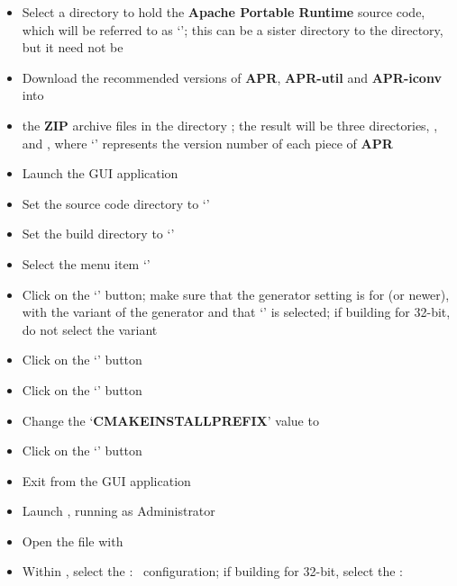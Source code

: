 \begin{itemize}
\item Select a directory to hold the \textbf{Apache Portable Runtime} source code, which
will be referred to as `'; this can be a sister directory to the
 directory, but it need not be
\item\exSp{}Download the recommended versions of \textbf{APR}, \textbf{APR-util} and
\textbf{APR-iconv} into 
\item\exSp{} the \textbf{ZIP} archive files in the directory
; the result will be three directories, ,\\
 and , where `'
represents the version number of each piece of \textbf{APR}
\item Launch the  GUI application
\item\exSp{}Set the source code directory to `'
\item\exSp{}Set the build directory to `'
\item\exSp{}Select the menu item `'
\item\exSp{}Click on the `' button; make sure that the generator
setting is for  (or newer), with the  variant of
the generator and that `' is selected; if building
for 32-bit, do not select the  variant
\item\exSp{}Click on the `' button
\item\exSp{}Click on the `' button
\item\exSp{}Change the `\textbf{CMAKE\fUS{}INSTALL\fUS{}PREFIX}' value to
\item\exSp{}Click on the `' button
\item\exSp{}Exit from the  GUI application
\item\exSp{}Launch , running as Administrator
\item\exSp{}Open the file
 with 
\item\exSp{}Within , select the  :\ 
configuration; if building for 32-bit, select the  :\ 

\end{itemize}
